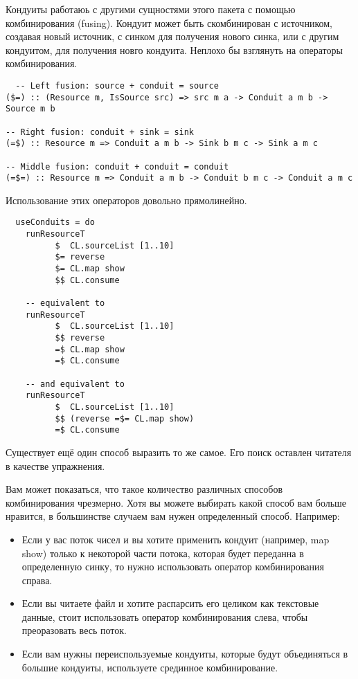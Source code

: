 Кондуиты работаюь с другими сущностями этого пакета с помощью комбинирования (fusing).
Кондуит может быть скомбинирован с источником, создавая новый источник, с синком для получения нового синка, или с другим кондуитом, для получения новго кондуита. Неплохо бы взглянуть на операторы комбинирования. 
\begin{lstlisting}
  -- Left fusion: source + conduit = source
($=) :: (Resource m, IsSource src) => src m a -> Conduit a m b -> Source m b

-- Right fusion: conduit + sink = sink
(=$) :: Resource m => Conduit a m b -> Sink b m c -> Sink a m c

-- Middle fusion: conduit + conduit = conduit
(=$=) :: Resource m => Conduit a m b -> Conduit b m c -> Conduit a m c
\end{lstlisting}
Использование этих операторов довольно прямолинейно.
\begin{lstlisting}
  useConduits = do
    runResourceT
          $  CL.sourceList [1..10]
          $= reverse
          $= CL.map show
          $$ CL.consume

    -- equivalent to
    runResourceT
          $  CL.sourceList [1..10]
          $$ reverse
          =$ CL.map show
          =$ CL.consume

    -- and equivalent to
    runResourceT
          $  CL.sourceList [1..10]
          $$ (reverse =$= CL.map show)
          =$ CL.consume
\end{lstlisting}
Существует ещё один способ выразить то же самое. Его поиск оставлен читателя в качестве упражнения.

Вам может показаться, что такое количество различных способов комбинирования чрезмерно. Хотя вы можете выбирать какой способ вам больше нравится, в большинстве случаем вам нужен определенный способ. Например:

\begin{itemize}   
\item Если у вас поток чисел и вы хотите применить кондуит (например, map show) только к некоторой части потока, которая будет переданна в определенную синку, то нужно использовать оператор комбинирования справа.
\item Если вы читаете файл и хотите распарсить его целиком как текстовые данные, стоит использовать оператор комбинирования слева, чтобы преоразовать весь поток.
\item Если вам нужны переиспользуемые кондуиты, которые будут объединяться в большие кондуиты, используете срединное комбинирование.
\end{itemize}

